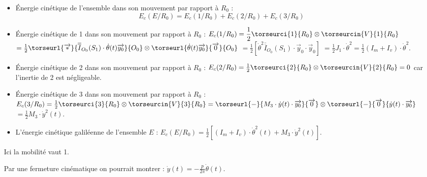 \ifprof\begin{corrige}
\begin{itemize}
\item Énergie cinétique de l'ensemble dans son mouvement par rapport à $R_0$ : 
$$
E_c(E/R_0)=E_c(1/R_0)+E_c(2/R_0)+E_c(3/R_0)
$$

\item Énergie cinétique de 1 dans son mouvement par rapport à $R_0$ :
$E_c(1/R_0)
=\dfrac{1}{2}
\torseurci{1}{R_0}
\otimes \torseurcin{V}{1}{R_0}$
$=\frac{1}{2}\torseurl{\overrightarrow{*}}{\overline{\overline{I}}_{O_0}(S_1)\cdot \dot{\theta}(t)\overrightarrow{y_0}}{O_0}\otimes
 \torseurl{\dot{\theta}(t)\overrightarrow{y_0}}{\overrightarrow{0}}{O_0}$
$=\frac{1}{2}\left[\dot{\theta}^2\overline{\overline{I}}_{O_0}(S_1)\cdot \overrightarrow{y}_0\cdot \overrightarrow{y}_0\right]$
$=\frac{1}{2}J_1\cdot \dot{\theta}^2=\frac{1}{2}\left(I_m+I_v\right)\cdot \dot{\theta}^2$.

\item Énergie cinétique de 2 dans son mouvement par rapport à $R_0$ : $
E_c(2/R_0)=\frac{1}{2}\torseurci{2}{R_0}\otimes \torseurcin{V}{2}{R_0}
=0$
car l'inertie de 2 est négligeable.
 
\item Énergie cinétique de 3 dans son mouvement par rapport à $R_0$ :$
E_c(3/R_0)=\frac{1}{2}\torseurci{3}{R_0}\otimes \torseurcin{V}{3}{R_0}
=\torseurl{-}{M_3\cdot \dot{y}(t)\cdot \overrightarrow{y_0}}{\overrightarrow{0}}\otimes
 \torseurl{-}{\overrightarrow{0}}{\dot{y}(t)\cdot\overrightarrow{y_0}}$ $ =\frac{1}{2}M_3\cdot \dot{y}^2(t)$.
 
\item L'énergie cinétique galiléenne de l'ensemble $E$ :
$E_c(E/R_0)=\frac{1}{2}\left[\left(I_m+I_v\right)\cdot \dot{\theta}^2(t)+ M_3\cdot \dot{y}^2(t)\right]$.
\end{itemize}
\end{corrige}\else\fi




\ifprof\begin{corrige}
Ici la mobilité vaut 1.
\end{corrige}\else\fi


\ifprof\begin{corrige}
Par une fermeture cinématique on pourrait montrer : $
\dot{y}(t)=-\frac{p}{2\pi}\dot{\theta}(t).
$
\end{corrige}\else\fi


